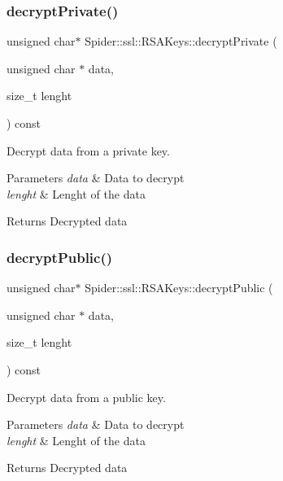 \subsubsection{\texorpdfstring{decrypt\+Private()}{decryptPrivate()}}
{\footnotesize\ttfamily unsigned char$\ast$ Spider\+::ssl\+::\+R\+S\+A\+Keys\+::decrypt\+Private (\begin{DoxyParamCaption}\item[{unsigned char $\ast$}]{data,  }\item[{size\+\_\+t}]{lenght }\end{DoxyParamCaption}) const}



Decrypt data from a private key. 


\begin{DoxyParams}{Parameters}
{\em data} & Data to decrypt \\
\hline
{\em lenght} & Lenght of the data \\
\hline
\end{DoxyParams}
\begin{DoxyReturn}{Returns}
Decrypted data 
\end{DoxyReturn}
\mbox{\label{class_spider_1_1ssl_1_1_r_s_a_keys_a9d981778deeb914140ea27e6144721b9}} 
\subsubsection{\texorpdfstring{decrypt\+Public()}{decryptPublic()}}
{\footnotesize\ttfamily unsigned char$\ast$ Spider\+::ssl\+::\+R\+S\+A\+Keys\+::decrypt\+Public (\begin{DoxyParamCaption}\item[{unsigned char $\ast$}]{data,  }\item[{size\+\_\+t}]{lenght }\end{DoxyParamCaption}) const}



Decrypt data from a public key. 


\begin{DoxyParams}{Parameters}
{\em data} & Data to decrypt \\
\hline
{\em lenght} & Lenght of the data \\
\hline
\end{DoxyParams}
\begin{DoxyReturn}{Returns}
Decrypted data 
\end{DoxyReturn}
\mbox{\label{class_spider_1_1ssl_1_1_r_s_a_keys_a69c6bda29d2dbec830038b1d0ae92ab0}} 
